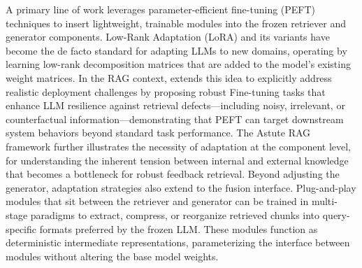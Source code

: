 \documentclass[11pt,a4paper]{article}
\begin{document}
A primary line of work leverages parameter-efficient fine-tuning (PEFT) techniques to insert lightweight, trainable modules into the frozen retriever and generator components. Low-Rank Adaptation (LoRA) and its variants have become the de facto standard for adapting LLMs to new domains, operating by learning low-rank decomposition matrices that are added to the model's existing weight matrices. In the RAG context, \cite{arxiv:2501.18365v1} extends this idea to explicitly address realistic deployment challenges by proposing robust Fine-tuning tasks that enhance LLM resilience against retrieval defects---including noisy, irrelevant, or counterfactual information---demonstrating that PEFT can target downstream system behaviors beyond standard task performance. The Astute RAG framework \cite{arxiv:2410.07176v2} further illustrates the necessity of adaptation at the component level, for understanding the inherent tension between internal and external knowledge that becomes a bottleneck for robust feedback retrieval. Beyond adjusting the generator, adaptation strategies also extend to the fusion interface. Plug-and-play modules that sit between the retriever and generator can be trained in multi-stage paradigms to extract, compress, or reorganize retrieved chunks into query-specific formats preferred by the frozen LLM. These modules function as deterministic intermediate representations, parameterizing the interface between modules without altering the base model weights.
\end{document}
